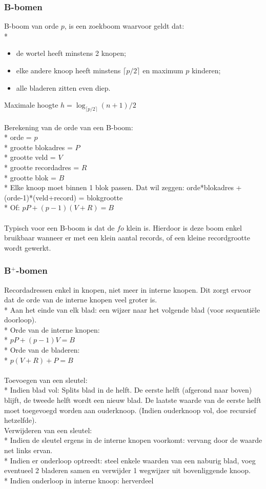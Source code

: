 \documentclass[10pt]{article}
\begin{document}
\subsubsection{B-bomen}
B-boom van orde $p$, is een zoekboom waarvoor geldt dat:\\*
\begin{itemize}
\item de wortel heeft minstens 2 knopen;
\item elke andere knoop heeft minstens $\lceil p/2 \rceil$ en maximum $p$ kinderen;
\item alle bladeren zitten even diep.
\end{itemize}
Maximale hoogte $h = \log_{\lceil p/2 \rceil}{(n+1)/2}$\\\\
Berekening van de orde van een B-boom:\\*
orde = $p$\\*
grootte blokadres = $P$\\*
grootte veld = $V$\\*
grootte recordadres = $R$\\*
grootte blok = $B$\\*
Elke knoop moet binnen 1 blok passen. Dat wil zeggen: orde*blokadres + (orde-1)*(veld+record) = blokgrootte\\*
Of: $pP+(p-1)(V+R) = B$\\\\
Typisch voor een B-boom is dat de $fo$ klein is. Hierdoor is deze boom enkel bruikbaar wanneer er met een klein aantal records, of een kleine recordgrootte wordt gewerkt.
\subsubsection{B$^+$-bomen}
Recordadressen enkel in knopen, niet meer in interne knopen. Dit zorgt ervoor dat de orde van de interne knopen veel groter is.\\*
Aan het einde van elk blad: een wijzer naar het volgende blad (voor sequenti\"ele doorloop).\\*
Orde van de interne knopen:\\*
$pP+(p-1)V = B$\\*
Orde van de bladeren:\\*
$p(V+R)+P = B$\\\\
Toevoegen van een sleutel:\\*
Indien blad vol: Splits blad in de helft. De eerste helft (afgerond naar boven) blijft, de tweede helft wordt een nieuw blad. De laatste waarde van de eerste helft moet toegevoegd worden aan ouderknoop. (Indien ouderknoop vol, doe recursief hetzelfde).\\
Verwijderen van een sleutel:\\*
Indien de sleutel ergens in de interne knopen voorkomt: vervang door de waarde net links ervan.\\*
Indien er onderloop optreedt: steel enkele waarden van een naburig blad, voeg eventueel 2 bladeren samen en verwijder 1 wegwijzer uit bovenliggende knoop.\\*
Indien onderloop in interne knoop: herverdeel
\end{document}
